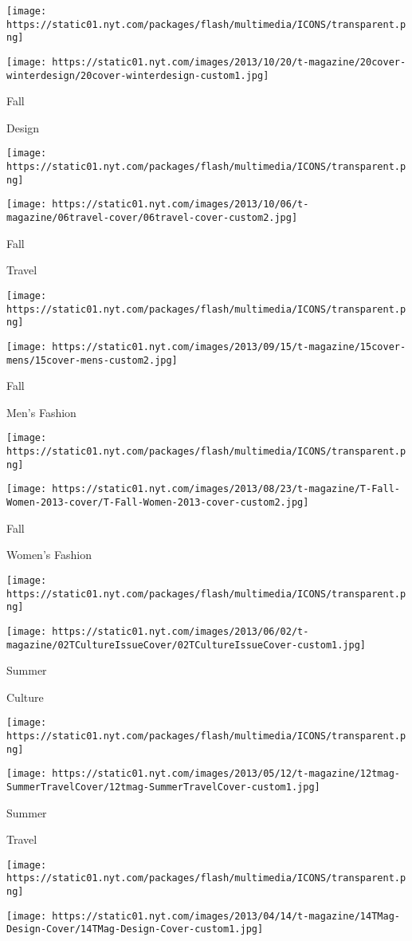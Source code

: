 \texttt{[image: https://static01.nyt.com/packages/flash/multimedia/ICONS/transparent.png]}

\texttt{[image: https://static01.nyt.com/images/2013/10/20/t-magazine/20cover-winterdesign/20cover-winterdesign-custom1.jpg]}

Fall

Design

\texttt{[image: https://static01.nyt.com/packages/flash/multimedia/ICONS/transparent.png]}

\texttt{[image: https://static01.nyt.com/images/2013/10/06/t-magazine/06travel-cover/06travel-cover-custom2.jpg]}

Fall

Travel

\texttt{[image: https://static01.nyt.com/packages/flash/multimedia/ICONS/transparent.png]}

\texttt{[image: https://static01.nyt.com/images/2013/09/15/t-magazine/15cover-mens/15cover-mens-custom2.jpg]}

Fall

Men's Fashion

\texttt{[image: https://static01.nyt.com/packages/flash/multimedia/ICONS/transparent.png]}

\texttt{[image: https://static01.nyt.com/images/2013/08/23/t-magazine/T-Fall-Women-2013-cover/T-Fall-Women-2013-cover-custom2.jpg]}

Fall

Women's Fashion

\texttt{[image: https://static01.nyt.com/packages/flash/multimedia/ICONS/transparent.png]}

\texttt{[image: https://static01.nyt.com/images/2013/06/02/t-magazine/02TCultureIssueCover/02TCultureIssueCover-custom1.jpg]}

Summer

Culture

\texttt{[image: https://static01.nyt.com/packages/flash/multimedia/ICONS/transparent.png]}

\texttt{[image: https://static01.nyt.com/images/2013/05/12/t-magazine/12tmag-SummerTravelCover/12tmag-SummerTravelCover-custom1.jpg]}

Summer

Travel

\texttt{[image: https://static01.nyt.com/packages/flash/multimedia/ICONS/transparent.png]}

\texttt{[image: https://static01.nyt.com/images/2013/04/14/t-magazine/14TMag-Design-Cover/14TMag-Design-Cover-custom1.jpg]}

